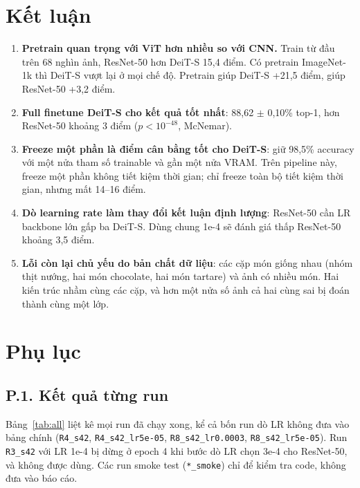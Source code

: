 \documentclass[12pt,a4paper]{article}
\begin{document}
\section{Kết luận}

\begin{enumerate}
\item \textbf{Pretrain quan trọng với ViT hơn nhiều so với CNN.} Train từ đầu trên 68
nghìn ảnh, ResNet-50 hơn DeiT-S 15,4 điểm. Có pretrain ImageNet-1k thì DeiT-S vượt lại
ở mọi chế độ. Pretrain giúp DeiT-S +21,5 điểm, giúp ResNet-50 +3,2 điểm.
\item \textbf{Full finetune DeiT-S cho kết quả tốt nhất}: 88,62 $\pm$ 0,10\% top-1,
hơn ResNet-50 khoảng 3 điểm ($p < 10^{-48}$, McNemar).
\item \textbf{Freeze một phần là điểm cân bằng tốt cho DeiT-S}: giữ 98,5\% accuracy với
một nửa tham số trainable và gần một nửa VRAM. Trên pipeline này, freeze một phần
không tiết kiệm thời gian; chỉ freeze toàn bộ tiết kiệm thời gian, nhưng mất 14--16
điểm.
\item \textbf{Dò learning rate làm thay đổi kết luận định lượng}: ResNet-50 cần LR
backbone lớn gấp ba DeiT-S. Dùng chung 1e-4 sẽ đánh giá thấp ResNet-50 khoảng 3,5
điểm.
\item \textbf{Lỗi còn lại chủ yếu do bản chất dữ liệu}: các cặp món giống nhau (nhóm
thịt nướng, hai món chocolate, hai món tartare) và ảnh có nhiều món. Hai kiến trúc
nhầm cùng các cặp, và hơn một nửa số ảnh cả hai cùng sai bị đoán thành cùng một lớp.
\end{enumerate}

\appendix
\section*{Phụ lục}

\subsection*{P.1. Kết quả từng run}

Bảng~\ref{tab:all} liệt kê mọi run đã chạy xong, kể cả bốn run dò LR không đưa vào
bảng chính (\texttt{R4\_s42}, \texttt{R4\_s42\_lr5e-05}, \texttt{R8\_s42\_lr0.0003},
\texttt{R8\_s42\_lr5e-05}). Run \texttt{R3\_s42} với LR 1e-4 bị dừng ở epoch 4 khi
bước dò LR chọn 3e-4 cho ResNet-50, và không được dùng. Các run smoke test
(\texttt{*\_smoke}) chỉ để kiểm tra code, không đưa vào báo cáo.
\end{document}
